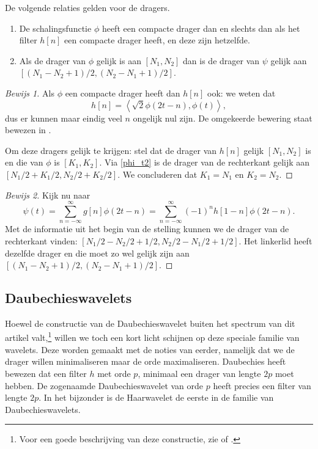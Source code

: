 \begin{stelling}
  De volgende relaties gelden voor de dragers.
  \begin{enumerate}
  \item De schalingsfunctie $\phi$ heeft een compacte drager dan en slechts dan als het filter $h[n]$ een compacte drager heeft, en deze zijn hetzelfde.
  \item Als de drager van $\phi$ gelijk is aan $[N_1,N_2]$ dan is de drager van $\psi$ gelijk aan $[(N_1 - N_2 + 1)/2, (N_2 - N_1 + 1)/2]$.
  \end{enumerate}
\end{stelling}
\begin{proof}[Bewijs 1] Als $\phi$ een compacte drager heeft dan $h[n]$ ook: we weten dat
  \begin{equation*}
    h[n] = \left\langle \sqrt{2} \phi\left(2t-n\right), \phi(t) \right\rangle,
  \end{equation*}
  dus er kunnen maar eindig veel $n$ ongelijk nul zijn. De omgekeerde bewering staat bewezen in 
  \cite[P965-967]{daubechies}.

  Om deze dragers gelijk te krijgen: stel dat de drager van $h[n]$ gelijk $[N_1,N_2]$ is
  en die van $\phi$ is $[K_1, K_2]$. Via \eqref{phi_t2} is de drager van de rechterkant gelijk aan $[N_1/2 + K_1/2, N_2/2 + K_2/2]$. We concluderen dat $K_1 = N_1$ en $K_2 = N_2$.
\end{proof}
\begin{proof}[Bewijs 2]
  Kijk nu naar
  \[
  \psi\left(t\right) = \sum_{n=-\infty}^{\infty} g[n] \phi(2t-n) = \sum_{n=-\infty}^{\infty} (-1)^{n}h[1-n] \phi(2t-n).
  \]
  Met de informatie uit het begin van de stelling kunnen we de drager van de rechterkant vinden: $[N_1/2 - N_2/2 + 1/2, N_2/2 - N_1/2 + 1/2]$. Het linkerlid heeft dezelfde drager en die moet zo wel gelijk zijn aan $[(N_1 - N_2 + 1)/2, (N_2 - N_1 + 1)/2]$.
\end{proof}

\subsection{Daubechieswavelets}
Hoewel de constructie van de Daubechieswavelet buiten het spectrum van dit artikel valt,\footnote{Voor een goede beschrijving van deze constructie, zie \cite{mallat} of \cite{daubechies}.} willen we toch een kort licht schijnen op deze speciale familie van wavelets. Deze worden gemaakt met de noties van eerder, namelijk dat we de drager willen minimaliseren maar de orde maximaliseren. Daubechies heeft bewezen\cite{daubechies} dat een filter $h$ met orde $p$, minimaal een drager van lengte $2p$ moet hebben. De zogenaamde Daubechieswavelet van orde $p$ heeft precies een filter van lengte $2p$. In het bijzonder is de Haarwavelet de eerste in de familie van Daubechieswavelets.


